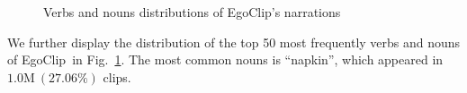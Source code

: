 \documentclass{article}
\newcommand{\dataset}{EgoClip}
\begin{document}
\begin{figure}[htb]
\vspace{-0.25cm}
\centering
{}
\vspace{-0.25cm}
\centering
\caption{Verbs and nouns distributions of \dataset’s narrations}
\label{fig_egoclip_v_n}
\vspace{-0.25cm}
\end{figure} We further display the distribution of the top 50 most frequently verbs and nouns of \dataset~in Fig.~\ref{fig_egoclip_v_n}.
The most common nouns is ``napkin'', which appeared in $1.0\text{M}~(27.06\%)$ clips. 
\end{document}

